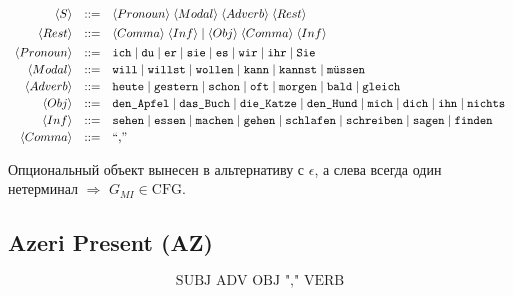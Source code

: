 \documentclass[areasetadvanced]{scrartcl}
\newcommand{\term}[1]{\text{\texttt{#1}}}
\begin{document}
\[
\begin{array}{rcl}
\langle S\rangle &::=&
  \langle Pronoun\rangle\;
  \langle Modal\rangle\;
  \langle Adverb\rangle\;
  \langle Rest\rangle \\[4pt]

\langle Rest\rangle &::=&
      \langle Comma\rangle\;\langle Inf\rangle
  \mid \langle Obj\rangle\;\langle Comma\rangle\;\langle Inf\rangle \\[4pt]

\langle Pronoun\rangle &::=&
  \term{ich}\mid\term{du}\mid\term{er}\mid\term{sie}\mid
  \term{es}\mid\term{wir}\mid\term{ihr}\mid\term{Sie} \\[2pt]

\langle Modal\rangle &::=&
  \term{will}\mid\term{willst}\mid\term{wollen}\mid
  \term{kann}\mid\term{kannst}\mid\term{müssen} \\[2pt]

\langle Adverb\rangle &::=&
  \term{heute}\mid\term{gestern}\mid\term{schon}\mid
  \term{oft}\mid\term{morgen}\mid\term{bald}\mid\term{gleich} \\[2pt]

\langle Obj\rangle &::=&
  \term{den\_Apfel}\mid\term{das\_Buch}\mid\term{die\_Katze}\mid
  \term{den\_Hund}\mid\term{mich}\mid\term{dich}\mid
  \term{ihn}\mid\term{nichts} \\[2pt]

\langle Inf\rangle &::=&
  \term{sehen}\mid\term{essen}\mid\term{machen}\mid
  \term{gehen}\mid\term{schlafen}\mid\term{schreiben}\mid
  \term{sagen}\mid\term{finden} \\[2pt]

\langle Comma\rangle &::=& \text{``,''}
\end{array}
\]


Опциональный объект вынесен в альтернативу с $\epsilon$, а слева всегда
один нетерминал $\Rightarrow$ $G_{MI}\in\text{CFG}$.

\bigskip
\subsection{Azeri Present (\textbf{AZ})}
\[
  \text{SUBJ ADV OBJ "," VERB}
\]
\end{document}
